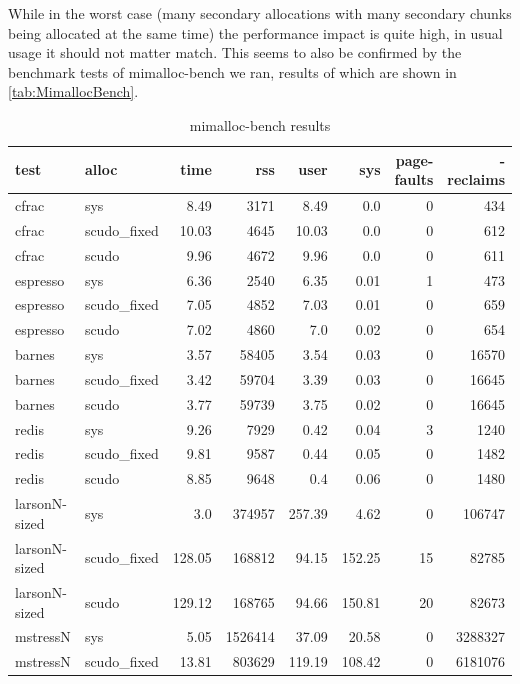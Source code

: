 \documentclass[a4paper,11pt,oneside]{report}
\begin{document}
While in the worst case (many secondary allocations with many secondary chunks being
allocated at the same time) the performance impact is quite high, in usual usage it should
not matter match. This seems to also be confirmed by the benchmark tests of mimalloc-bench
we ran, results of which are shown in \autoref{tab:MimallocBench}.

\begin{longtable}[h]{l l r r r r r r}
  \caption{mimalloc-bench results}\label{tab:MimallocBench} \\

  \toprule
  test & alloc & time & rss & user & sys & page-faults & -reclaims \\
  \midrule
  \endhead{}
  cfrac & sys & 8.49 & 3171 & 8.49 & 0.0 & 0 & 434 \\
  \midrule
  cfrac & scudo\_fixed & 10.03 & 4645 & 10.03 & 0.0 & 0 & 612 \\
  \midrule
  cfrac & scudo & 9.96 & 4672 & 9.96 & 0.0 & 0 & 611 \\
  \midrule
  espresso & sys & 6.36 & 2540 & 6.35 & 0.01 & 1 & 473 \\
  \midrule
  espresso & scudo\_fixed & 7.05 & 4852 & 7.03 & 0.01 & 0 & 659 \\
  \midrule
  espresso & scudo & 7.02 & 4860 & 7.0 & 0.02 & 0 & 654 \\
  \midrule
  barnes & sys & 3.57 & 58405 & 3.54 & 0.03 & 0 & 16570 \\
  \midrule
  barnes & scudo\_fixed & 3.42 & 59704 & 3.39 & 0.03 & 0 & 16645 \\
  \midrule
  barnes & scudo & 3.77 & 59739 & 3.75 & 0.02 & 0 & 16645 \\
  \midrule
  redis & sys & 9.26 & 7929 & 0.42 & 0.04 & 3 & 1240 \\
  \midrule
  redis & scudo\_fixed & 9.81 & 9587 & 0.44 & 0.05 & 0 & 1482 \\
  \midrule
  redis & scudo & 8.85 & 9648 & 0.4 & 0.06 & 0 & 1480 \\
  \midrule
  larsonN-sized & sys & 3.0 & 374957 & 257.39 & 4.62 & 0 & 106747 \\
  \midrule
  larsonN-sized & scudo\_fixed & 128.05 & 168812 & 94.15 & 152.25 & 15 & 82785 \\
  \midrule
  larsonN-sized & scudo & 129.12 & 168765 & 94.66 & 150.81 & 20 & 82673 \\
  \midrule
  mstressN & sys & 5.05 & 1526414 & 37.09 & 20.58 & 0 & 3288327 \\
  \midrule
  mstressN & scudo\_fixed & 13.81 & 803629 & 119.19 & 108.42 & 0 & 6181076 \\

\end{longtable}
\end{document}
